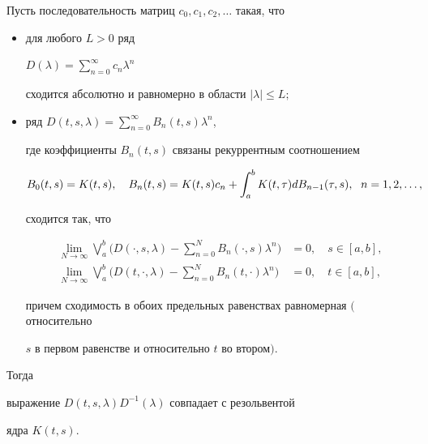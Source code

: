 \begin{thm}


Пусть последовательность матриц $c_0,c_1,c_2,\dotsc$ такая, что


\begin{itemize}


\item[1)] для любого $L>0$ ряд


$D(\lambda)=\sum\limits_{n=0}^\infty c_n\lambda^n$


сходится абсолютно и равномерно в области $\vert\lambda\vert\leq L;$


\item[2)] ряд $D(t,s,\lambda)=\sum\limits_{n=0}^\infty B_n(t,s)\lambda^n$,


где коэффициенты $B_n(t,s)$ связаны рекуррентным соотношением


$$\label{rec}


B_0(t,s)=K(t,s),\quad


B_n(t,s)=K(t,s)c_n+\integral{a}{b}K(t,\tau)dB_{n-1}(\tau,s),\ \;


n=1,2,\dotsc,


$$


сходится так, что


\begin{align*}\label{lims}


\lim_{N\to\infty}\bigvee\limits_a^b\bigg(D(\cdot,s,\lambda)-


\sum_{n=0}^N B_n(\cdot,s)\lambda^n\bigg)&=0,\quad s\in[a,b],\\


\lim_{N\to\infty}\bigvee\limits_a^b\bigg(D(t,\cdot,\lambda)-


\sum_{n=0}^N B_n(t,\cdot)\lambda^n\bigg)&=0,\quad t\in[a,b],


\end{align*}


причем сходимость в обоих предельных равенствах равномерная $($относительно


$s$ в первом равенстве и относительно $t$ во втором$)$.


\end{itemize}





Тогда


выражение $D(t,s,\lambda)D^{-1}(\lambda)$ совпадает с резольвентой


ядра $K(t,s)$.


\end{thm}






